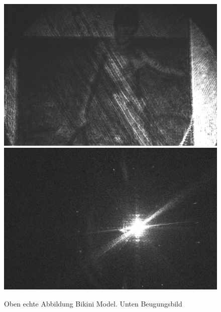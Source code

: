 \begin{figure}[h]
	\centering
	\includegraphics[width=\textwidth]{Daten/frau_1.jpg}
	\includegraphics[width=\textwidth]{Daten/frau_2.jpg}
	\caption[Aufnahme Model]{Oben echte Abbildung Bikini Model. Unten Beugungsbild}
\end{figure}
